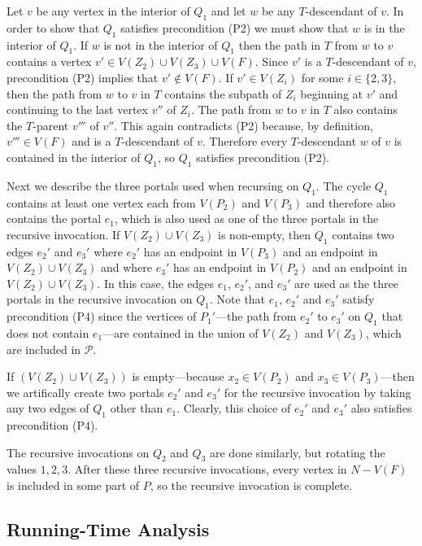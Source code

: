 \documentclass[kpfonts]{patmorin}
\begin{document}
Let $v$ be any vertex in the interior of $Q_1$ and let $w$ be any $T$-descendant of $v$.  In order to show that $Q_1$ satisfies precondition (P2) we must show that $w$ is in the interior of $Q_1$.  If $w$ is not in the interior of $Q_1$ then the path in $T$ from $w$ to $v$ contains a vertex $v'\in V(Z_2)\cup V(Z_3)\cup V(F)$.  Since $v'$ is a $T$-descendant of $v$, precondition (P2) implies that $v'\not\in V(F)$.  If $v'\in V(Z_i)$ for some $i\in\{2,3\}$, then the path from $w$ to $v$ in $T$ contains the subpath of $Z_i$ beginning at $v'$ and continuing to the last vertex $v''$ of $Z_i$.  The path from $w$ to $v$ in $T$ also contains the $T$-parent $v'''$ of $v''$.  This again contradicts (P2) because, by definition, $v'''\in V(F)$ and is a $T$-descendant of $v$.  Therefore every $T$-descendant $w$ of $v$ is contained in the interior of $Q_1$, so $Q_1$ satisfies precondition (P2).

Next we describe the three portals used when recursing on $Q_1$.
The cycle $Q_1$ contains at least one vertex each from $V(P_2)$ and $V(P_3)$ and therefore also contains the portal $e_1$, which is also used as one of the three portals in the recursive invocation.  If $V(Z_2)\cup V(Z_3)$ is non-empty, then $Q_1$ contains two edges $e_2'$ and $e_3'$ where $e_2'$ has an endpoint in $V(P_3)$ and an endpoint in $V(Z_2)\cup V(Z_3)$ and where $e_3'$ has an endpoint in $V(P_2)$ and an endpoint in $V(Z_2)\cup V(Z_3)$.  In this case, the edges $e_1$, $e_2'$, and $e_3'$ are used as the three portals in the recursive invocation on $Q_1$.  Note that $e_1$, $e_2'$ and $e_3'$ satisfy precondition (P4) since the vertices of $P_1'$---the path from $e_2'$ to $e_3'$ on $Q_1$ that does not contain $e_1$---are contained in the union of $V(Z_2)$ and $V(Z_3)$, which are included in $\mathcal{P}$.

If $(V(Z_2)\cup V(Z_3))$ is empty---because $x_2\in V(P_2)$ and $x_3\in V(P_3)$---then we artifically create two portals $e_2'$ and $e_3'$ for the recursive invocation by taking any two edges of $Q_1$ other than $e_1$. Clearly, this choice of $e_2'$ and $e_3'$ also satisfies precondition (P4).

The recursive invocations on $Q_2$ and $Q_3$ are done similarly, but rotating the values $1,2,3$.  After these three recursive invocations, every vertex in $N-V(F)$ is included in some part of $P$, so the recursive invocation is complete.

\subsection{Running-Time Analysis}
\end{document}
